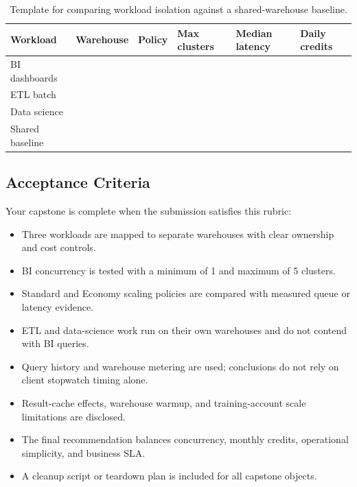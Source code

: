 \begin{table}[H]
\centering
\small
\begin{tabular}{@{}p{2.2cm}p{2.0cm}p{2.0cm}p{2.0cm}p{2.2cm}p{2.2cm}@{}}
\toprule
\textbf{Workload} & \textbf{Warehouse} & \textbf{Policy} & \textbf{Max clusters} & \textbf{Median latency} & \textbf{Daily credits} \\
\midrule
BI dashboards & & & & & \\
ETL batch & & & & & \\
Data science & & & & & \\
Shared baseline & & & & & \\
\bottomrule
\end{tabular}
\caption{Template for comparing workload isolation against a shared-warehouse baseline.}
\label{tab:chapter2-capstone-comparison}
\end{table}

\subsection*{Acceptance Criteria}
Your capstone is complete when the submission satisfies this rubric:
\begin{itemize}
    \item Three workloads are mapped to separate warehouses with clear ownership and cost controls.
    \item BI concurrency is tested with a minimum of 1 and maximum of 5 clusters.
    \item Standard and Economy scaling policies are compared with measured queue or latency evidence.
    \item ETL and data-science work run on their own warehouses and do not contend with BI queries.
    \item Query history and warehouse metering are used; conclusions do not rely on client stopwatch timing alone.
    \item Result-cache effects, warehouse warmup, and training-account scale limitations are disclosed.
    \item The final recommendation balances concurrency, monthly credits, operational simplicity, and business SLA.
    \item A cleanup script or teardown plan is included for all capstone objects.
\end{itemize}

